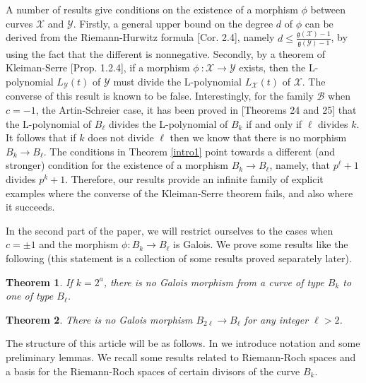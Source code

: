 \documentclass[oneside,a4paper,12pt]{article}
\theoremstyle{plain} %
\newtheorem{theorem}{Theorem}[section]
\theoremstyle{definition} %
\begin{document}
A number of results give conditions on the existence of a morphism $\phi$ between curves $\mathcal{X}$ and $\mathcal{Y}$. Firstly, a general upper bound on the degree $d$ of $\phi$ can be derived from the Riemann-Hurwitz formula \cite{hartshorne1977algebraic}[Cor. 2.4], namely $d\leq \frac{\mathfrak{g}(\mathcal{X})-1}{\mathfrak{g}(\mathcal{Y})-1}$,
by using the fact that the different is  nonnegative.
Secondly,  by a theorem of Kleiman-Serre \cite{kleiman1968algebraic}[Prop. 1.2.4], if a morphism 
$\phi~\colon \mathcal{X}\longrightarrow \mathcal{Y}$ exists, then the L-polynomial $L_{\mathcal{Y}}(t)$ of $\mathcal{Y}$ must divide the L-polynomial $L_{\mathcal{X}}(t)$ of $\mathcal{X}$. The converse of this result is known to be false.
Interestingly, for the family $\mathcal{B}$ when $c=-1$, 
the Artin-Schreier case, it has been proved in \cite{MCGUIRE20193341}[Theorems 24 and 25] that the L-polynomial of $B_\ell$ divides the L-polynomial of $B_k$ if and only if $\ell$ divides $k$. 
It follows that if $k$ does not divide $\ell$ then we know that there is no morphism
$B_k \longrightarrow B_\ell$.
The conditions in Theorem \ref{intro1} point towards a different (and stronger) condition 
for the existence of a morphism $ B_{k} \longrightarrow B_{\ell}$, namely,
that $p^\ell +1$  divides $p^k+1$.
Therefore, our results provide an infinite family of explicit examples where the converse of the
Kleiman-Serre theorem fails, and also where it succeeds.



In the second part of the paper, we will restrict ourselves to the cases when $c=\pm 1$ and the morphism $\phi: B_k \longrightarrow B_\ell$ is Galois. 
We prove some results like the following (this statement is a collection of some results proved separately later).




\begin{theorem}
If $k=2^a$, there is no Galois morphism from a curve of type $B_k$ to one of type $B_{\ell}$. 

\end{theorem}

\begin{theorem}
There is no Galois morphism
$B_{2\ell}\longrightarrow B_\ell$ for any integer $\ell > 2$.
\end{theorem}






The structure of this article will be as follows. 
In  we introduce notation and some preliminary lemmas.
We recall some results related to  Riemann-Roch spaces and a basis for the Riemann-Roch spaces of certain divisors of the curve $B_k$.
\end{document}
